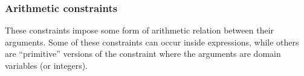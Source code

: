 


\subsubsection{Arithmetic constraints}

These constraints impose some form of arithmetic relation between their
arguments. Some of these constraints can occur inside expressions, while
others are ``primitive'' versions of the constraint where the arguments
are domain variables (or integers).



